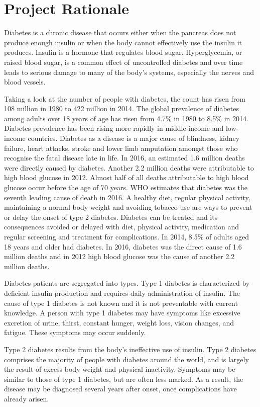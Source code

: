 \documentclass[12pt]{article}
\begin{document}
\newpage
\section{Project Rationale}
Diabetes is a chronic disease that occurs either when the pancreas does not produce enough insulin or when the body cannot effectively use the insulin it produces. Insulin is a hormone that regulates blood sugar. Hyperglycemia, or raised blood sugar, is a common effect of uncontrolled diabetes and over time leads to serious damage to many of the body's systems, especially the nerves and blood vessels.

Taking a look at the number of people with diabetes, the count has risen from 108 million in 1980 to 422 million in 2014.
The global prevalence of diabetes among adults over 18 years of age has risen from 4.7\% in 1980 to 8.5\% in 2014. Diabetes prevalence has been rising more rapidly in middle-income and low-income countries.
Diabetes as a disease is a major cause of blindness, kidney failure, heart attacks, stroke and lower limb amputation amongst those who recognise the fatal disease late in life.
In 2016, an estimated 1.6 million deaths were directly caused by diabetes. Another 2.2 million deaths were attributable to high blood glucose in 2012. Almost half of all deaths attributable to high blood glucose occur before the age of 70 years. WHO estimates that diabetes was the seventh leading cause of death in 2016. A healthy diet, regular physical activity, maintaining a normal body weight and avoiding tobacco use are ways to prevent or delay the onset of type 2 diabetes. Diabetes can be treated and its consequences avoided or delayed with diet, physical activity, medication and regular screening and treatment for complications. In 2014, 8.5\% of adults aged 18 years and older had diabetes. In 2016, diabetes was the direct cause of 1.6 million deaths and in 2012 high blood glucose was the cause of another 2.2 million deaths.

Diabetes patients are segregated into types. Type 1 diabetes is characterized by deficient insulin production and requires daily administration of insulin. The cause of type 1 diabetes is not known and it is not preventable with current knowledge. A person with type 1 diabetes may have symptoms like excessive excretion of urine, thirst, constant hunger, weight loss, vision changes, and fatigue. These symptoms may occur suddenly.

Type 2 diabetes results from the body’s ineffective use of insulin. Type 2 diabetes comprises the majority of people with diabetes around the world, and is largely the result of excess body weight and physical inactivity. Symptoms may be similar to those of type 1 diabetes, but are often less marked. As a result, the disease may be diagnosed several years after onset, once complications have already arisen.
\end{document}
